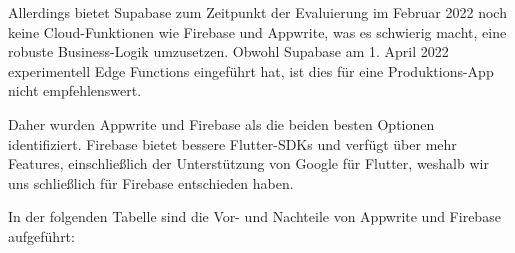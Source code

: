 Allerdings bietet Supabase zum Zeitpunkt der Evaluierung im Februar 2022 noch keine Cloud-Funktionen wie Firebase und Appwrite, was es schwierig macht, eine robuste Business-Logik umzusetzen. Obwohl Supabase am 1. April 2022 experimentell Edge Functions eingeführt hat, ist dies für eine Produktions-App nicht empfehlenswert.

Daher wurden Appwrite und Firebase als die beiden besten Optionen identifiziert. Firebase bietet bessere Flutter-SDKs und verfügt über mehr Features, einschließlich der Unterstützung von Google für Flutter, weshalb wir uns schließlich für Firebase entschieden haben.

In der folgenden Tabelle sind die Vor- und Nachteile von Appwrite und Firebase aufgeführt:










